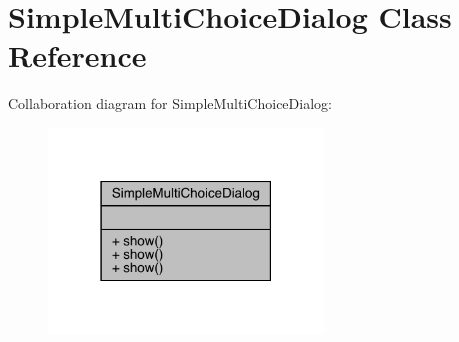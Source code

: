 \hypertarget{classcom_1_1toast_1_1android_1_1gamebase_1_1base_1_1ui_1_1_simple_multi_choice_dialog}{}\section{Simple\+Multi\+Choice\+Dialog Class Reference}
\label{classcom_1_1toast_1_1android_1_1gamebase_1_1base_1_1ui_1_1_simple_multi_choice_dialog}


Collaboration diagram for Simple\+Multi\+Choice\+Dialog\+:
\nopagebreak
\begin{figure}[H]
\begin{center}
\leavevmode
\includegraphics[width=207pt]{classcom_1_1toast_1_1android_1_1gamebase_1_1base_1_1ui_1_1_simple_multi_choice_dialog__coll__graph}
\end{center}
\end{figure}
